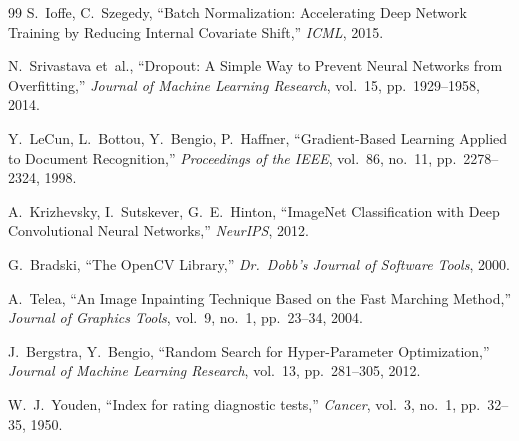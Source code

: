 \documentclass[10pt,twocolumn]{article}
\begin{document}
\begin{thebibliography}{99}
 S.~Ioffe, C.~Szegedy,
``Batch Normalization: Accelerating Deep Network Training by Reducing Internal
Covariate Shift,'' \emph{ICML}, 2015.

 N.~Srivastava et~al.,
``Dropout: A Simple Way to Prevent Neural Networks from Overfitting,''
\emph{Journal of Machine Learning Research}, vol.~15, pp.~1929--1958, 2014.

 Y.~LeCun, L.~Bottou, Y.~Bengio, P.~Haffner,
``Gradient-Based Learning Applied to Document Recognition,'' \emph{Proceedings of
the IEEE}, vol.~86, no.~11, pp.~2278--2324, 1998.

 A.~Krizhevsky, I.~Sutskever, G.~E.~Hinton,
``ImageNet Classification with Deep Convolutional Neural Networks,''
\emph{NeurIPS}, 2012.

 G.~Bradski,
``The OpenCV Library,'' \emph{Dr.\ Dobb's Journal of Software Tools}, 2000.

 A.~Telea,
``An Image Inpainting Technique Based on the Fast Marching Method,''
\emph{Journal of Graphics Tools}, vol.~9, no.~1, pp.~23--34, 2004.

 J.~Bergstra, Y.~Bengio,
``Random Search for Hyper-Parameter Optimization,'' \emph{Journal of Machine
Learning Research}, vol.~13, pp.~281--305, 2012.

 W.~J.~Youden,
``Index for rating diagnostic tests,'' \emph{Cancer}, vol.~3, no.~1,
pp.~32--35, 1950.
\end{thebibliography}
\end{document}
